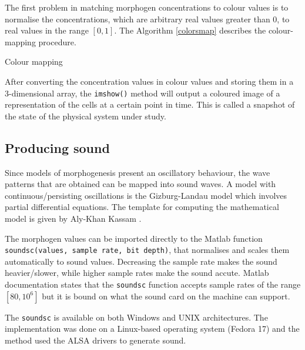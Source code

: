 The first problem in matching morphogen concentrations to colour values is to normalise the concentrations, which are arbitrary real values greater than 0, to real values in the range $ [0,1] $. The Algorithm \ref{colorsmap} describes the colour-mapping procedure.

\begin{algorithm}                      
\caption{Colour mapping}          
\label{colorsmap}                          
\begin{algorithmic}                    
    \ENDFOR
\end{algorithmic}
\end{algorithm}    

After converting the concentration values in colour values and storing them in a 3-dimensional array, the \texttt{imshow()} method will output a coloured image of a representation of the cells at a certain point in time. This is called a snapshot of the state of the physical system under study.
	\subsection{Producing sound}

    Since models of morphogenesis present an oscillatory behaviour, the wave patterns that are obtained can be mapped into sound waves. A model with continuous/persisting oscillations is the Gizburg-Landau model which involves partial differential equations. The template for computing the mathematical model is given by Aly-Khan Kassam \cite{kassam_solving_2003}.
    
    The morphogen values can be imported directly to the Matlab function \texttt{soundsc(values, sample rate, bit depth)}, that normalises and scales them automatically to sound values. Decreasing the sample rate makes the sound heavier/slower, while higher sample rates make the sound accute. Matlab documentation states that the \texttt{soundsc} function accepts sample rates of the range $[80,10^6]$ \cite{MATLAB_2010} but it is bound on what the sound card on the machine can support.

    The \texttt{soundsc} is available on both Windows and UNIX architectures. The implementation was done on a Linux-based operating system (Fedora 17) and the method used the ALSA drivers to generate sound. 



